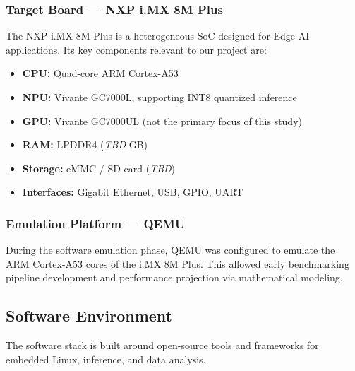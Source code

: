 \subsubsection{Target Board — NXP i.MX 8M Plus}
The NXP i.MX 8M Plus \cite{ref:imx8mplus} is a heterogeneous SoC designed for Edge AI applications. Its key components relevant to our project are:
\begin{itemize}
    \item \textbf{CPU:} Quad-core ARM Cortex-A53
    \item \textbf{NPU:} Vivante GC7000L, supporting INT8 quantized inference
    \item \textbf{GPU:} Vivante GC7000UL (not the primary focus of this study)
    \item \textbf{RAM:} LPDDR4 (\textit{TBD} GB)
    \item \textbf{Storage:} eMMC / SD card (\textit{TBD})
    \item \textbf{Interfaces:} Gigabit Ethernet, USB, GPIO, UART
\end{itemize}

\subsubsection{Emulation Platform — QEMU}
During the software emulation phase, QEMU was configured to emulate the ARM Cortex-A53 cores of the i.MX 8M Plus. This allowed early benchmarking pipeline development and performance projection via mathematical modeling.

\subsection{Software Environment}
The software stack is built around open-source tools and frameworks for embedded Linux, inference, and data analysis.


